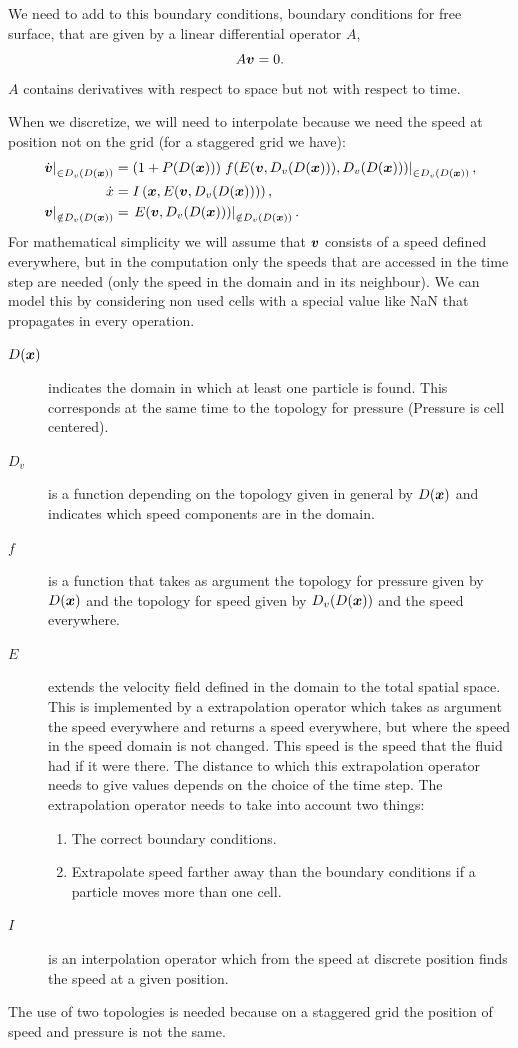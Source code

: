 We need to add to this boundary conditions, boundary conditions for free surface, that are given by a linear differential operator $A$,
\begin{equation}
	A{\boldsymbol {v}}=0.
\end{equation}
$A$ contains derivatives with respect to space but not with respect to time.

When we discretize, we will need to interpolate because we need the speed at position not on the grid (for a staggered grid we have):
\begin{align*}
	\left.\dot{{\boldsymbol {v}}}\right|_{\in D_{v}(D({\boldsymbol {x}}))}&=\left(1+P(D({\boldsymbol {x}}))\right)\left.f(E({\boldsymbol {v}},D_v(D({\boldsymbol {x}}))),D_{v}(D({\boldsymbol {x}})))\right|_{\in D_{v}(D({\boldsymbol {x}}))},\\
	\dot{x}&=I\left({\boldsymbol {x}},E({\boldsymbol {v}},D_v(D({\boldsymbol {x}})))\right),\\
	\left.{\boldsymbol {v}}\right|_{\notin D_{v}(D({\boldsymbol {x}}))}&=\left.E({\boldsymbol {v}},D_v(D({\boldsymbol {x}})))\right|_{\notin D_{v}(D({\boldsymbol {x}}))}.
\end{align*}
For mathematical simplicity we will assume that ${\boldsymbol {v}}$ consists of a speed defined everywhere, 
but in the computation only the speeds that are accessed in the time step are needed (only the speed in the domain and in its neighbour).
We can model this by considering non used cells with a special value like NaN that propagates in every operation.
\begin{description}
\item[$D({\boldsymbol {x}})$] indicates the domain in which at least one particle is found. This corresponds at the same time to the topology for pressure (Pressure is cell centered).
\item[$D_{v}$] is a function depending on the topology given in general by $D({\boldsymbol {x}})$ and indicates which speed components are in the domain.
\item[$f$] is a function that takes as argument the topology for pressure given by $D({\boldsymbol {x}})$ and the topology for speed given by $D_v(D({\boldsymbol {x}}))$ and the speed everywhere.
\item[$E$] extends the velocity field defined in the domain to the total spatial space.
This is implemented by a extrapolation operator which takes as argument the speed everywhere and returns a speed everywhere,
but where the speed in the speed domain is not changed. This speed is the speed that the fluid had if it were there.
The distance to which this extrapolation operator needs to give values depends on the choice of the time step.
The extrapolation operator needs to take into account two things:
\begin{enumerate}
	\item The correct boundary conditions.
	\item Extrapolate speed farther away than the boundary conditions if a particle moves more than one cell.
\end{enumerate}
\item[$I$] is an interpolation operator which from the speed at discrete position finds the speed at a given position.
\end{description}
The use of two topologies is needed because on a staggered grid the position of speed and pressure is not the same.

